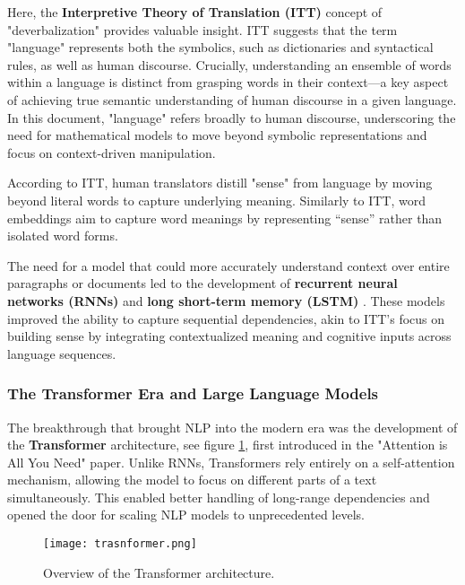 Here, the \textbf{Interpretive Theory of Translation (ITT)}\cite{seleskovitch1976interpretation} concept of "deverbalization" provides valuable insight.
ITT suggests that the term "language" represents both the symbolics, such as dictionaries and syntactical rules, as well as human discourse.
Crucially, understanding an ensemble of words within a language is distinct from grasping words in their context—a key aspect of achieving true semantic understanding of human discourse in a given language.
In this document, "language" refers broadly to human discourse, underscoring the need for mathematical models to move beyond symbolic representations and focus on context-driven manipulation.

According to ITT, human translators distill "sense" from language by moving beyond literal words to capture underlying meaning.
Similarly to ITT, word embeddings aim to capture word meanings by representing “sense” rather than isolated word forms. 

The need for a model that could more accurately understand context over entire paragraphs or documents led to the development of \textbf{recurrent neural networks (RNNs)} \cite{Rumelhart1986LearningIR} and \textbf{long short-term memory (LSTM)} \cite{hochreiter1997long}.
These models improved the ability to capture sequential dependencies, akin to ITT's focus on building sense by integrating contextualized meaning and cognitive inputs across language sequences.

\subsubsection{ The Transformer Era and Large Language Models}

The breakthrough that brought NLP into the modern era was the development of the \textbf{Transformer} architecture, see figure \ref{fig:transformer}, first introduced in the "Attention is All You Need" paper\cite{vaswani2017attention}.
Unlike RNNs, Transformers rely entirely on a self-attention mechanism, allowing the model to focus on different parts of a text simultaneously.
This enabled better handling of long-range dependencies and opened the door for scaling NLP models to unprecedented levels.

\begin{figure}[!h]
    \centering
    \texttt{[image: trasnformer.png]}
    \caption{Overview of the Transformer architecture.}
    \vspace{0.1cm}
    \label{fig:transformer}
\end{figure}

